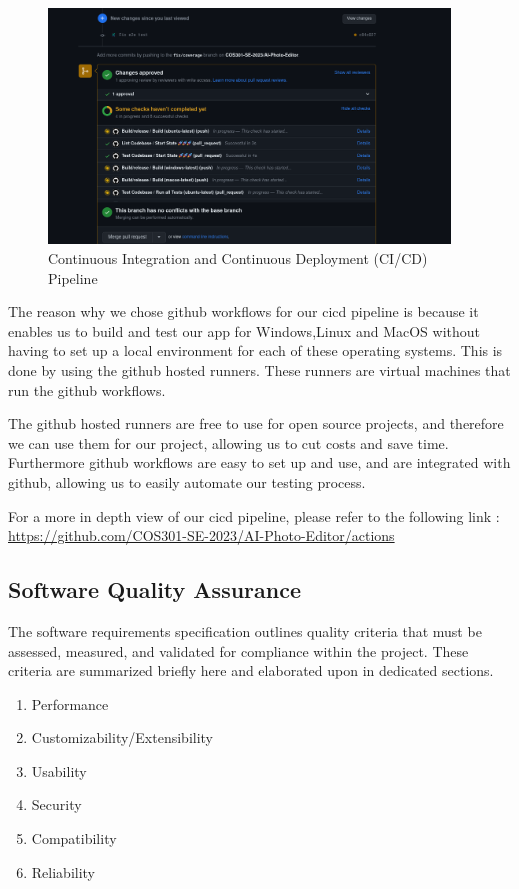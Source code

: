 \documentclass[11pt,a4paper]{article}
\begin{document}
\begin{figure}[htbp]
  \centering
  \includegraphics[width=0.95\textwidth]{../pics/cicd.png}
  \caption{Continuous Integration and Continuous Deployment (CI/CD) Pipeline}
\end{figure}

The reason why we chose github workflows for our cicd pipeline is because it enables us to build and test our app for Windows,Linux and MacOS without having to set up a local environment for each of these operating systems.
This is done by using the github hosted runners. These runners are virtual machines that run the github workflows. 

The github hosted runners are free to use for open source projects, and therefore we can use them for our project,
allowing us to cut costs and save time. Furthermore github workflows are easy to set up and use, and are integrated with github, allowing us to easily automate our testing process.

For a more in depth view of our cicd pipeline, please refer to the following link : \url{https://github.com/COS301-SE-2023/AI-Photo-Editor/actions}

\subsection*{Software Quality Assurance}

The software requirements specification outlines quality criteria that must be assessed, measured, and validated for compliance within the project. 
These criteria are summarized briefly here and elaborated upon in dedicated sections.

\begin{enumerate}[label*=\arabic*.]
  \item Performance
  \item Customizability/Extensibility
  \item Usability
  \item Security
  \item Compatibility
  \item Reliability
\end{enumerate}
\end{document}
